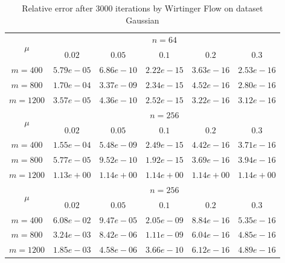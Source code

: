 \documentclass{article}
\begin{document}
\begin{table}
	\centering
	\begin{tabular}{|c|c|c|c|c|c|}
	\hline
	\multirow{2}{*}{ $\mu$} &\multicolumn{5}{c|}{$n = 64 $}\\\cline{2-6}
	 &$0.02$ &$0.05$ &$0.1$ &$0.2$ &$0.3$\\\hline
	$m=400$ & $5.79e-05$ & $6.86e-10$ & $2.22e-15$ & $3.63e-16$ & $2.53e-16$\\\hline
	$m=800$ & $1.70e-04$ & $3.37e-09$ & $2.34e-15$ & $4.52e-16$ & $2.80e-16$\\\hline
	$m=1200$ & $3.57e-05$ & $4.36e-10$ & $2.52e-15$ & $3.22e-16$ & $3.12e-16$\\\hline
	\multirow{2}{*}{ $\mu$} &\multicolumn{5}{c|}{$n = 256 $}\\\cline{2-6}
	&$0.02$ &$0.05$ &$0.1$ &$0.2$ &$0.3$\\\hline
	$m=400$ & $1.55e-04$ & $5.48e-09$ & $2.49e-15$ & $4.42e-16$ & $3.71e-16$\\\hline
	$m=800$ & $5.77e-05$ & $9.52e-10$ & $1.92e-15$ & $3.69e-16$ & $3.94e-16$\\\hline
	$m=1200$ & $1.13e+00$ & $1.14e+00$ & $1.14e+00$ & $1.14e+00$ & $1.14e+00$\\\hline
	\multirow{2}{*}{ $\mu$} &\multicolumn{5}{c|}{$n = 256 $}\\\cline{2-6}
 &$0.02$ &$0.05$ &$0.1$ &$0.2$ &$0.3$\\\hline
$m=400$ & $6.08e-02$ & $9.47e-05$ & $2.05e-09$ & $8.84e-16$ & $5.35e-16$\\\hline
$m=800$ & $3.24e-03$ & $8.42e-06$ & $1.11e-09$ & $6.04e-16$ & $4.85e-16$\\\hline
$m=1200$ & $1.85e-03$ & $4.58e-06$ & $3.66e-10$ & $6.12e-16$ & $4.89e-16$\\\hline
	\end{tabular}
	\caption{Relative error after $3000$ iterations by Wirtinger Flow on dataset Gaussian\label{gaussian}}
	\end{table}
\end{document}

